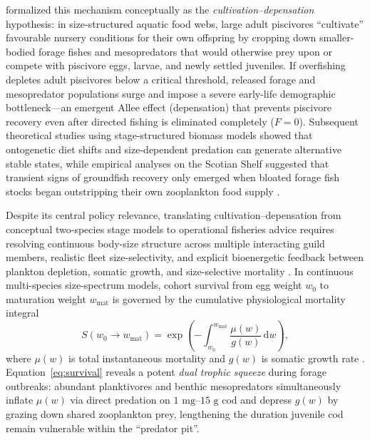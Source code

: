 \documentclass[11pt,letterpaper]{article}
\begin{document}
\citet{walters2001cultivation} formalized this mechanism conceptually as the \emph{cultivation--depensation} hypothesis: in size-structured aquatic food webs, large adult piscivores ``cultivate'' favourable nursery conditions for their own offspring by cropping down smaller-bodied forage fishes and mesopredators that would otherwise prey upon or compete with piscivore eggs, larvae, and newly settled juveniles. If overfishing depletes adult piscivores below a critical threshold, released forage and mesopredator populations surge and impose a severe early-life demographic bottleneck---an emergent Allee effect (depensation) that prevents piscivore recovery even after directed fishing is eliminated completely ($F = 0$). Subsequent theoretical studies using stage-structured biomass models \citep{vanleeuwen2008how,gardmark2015regime} showed that ontogenetic diet shifts and size-dependent predation can generate alternative stable states, while empirical analyses on the Scotian Shelf suggested that transient signs of groundfish recovery only emerged when bloated forage fish stocks began outstripping their own zooplankton food supply \citep{frank2011transient}.

Despite its central policy relevance, translating cultivation--depensation from conceptual two-species stage models to operational fisheries advice requires resolving continuous body-size structure across multiple interacting guild members, realistic fleet size-selectivity, and explicit bioenergetic feedback between plankton depletion, somatic growth, and size-selective mortality \citep{andersen2010damped,scott2014mizer,andersen2019fish}. In continuous multi-species size-spectrum models, cohort survival from egg weight $w_0$ to maturation weight $w_{\mathrm{mat}}$ is governed by the cumulative physiological mortality integral
\begin{equation}
  S(w_0 \to w_{\mathrm{mat}}) = \exp\!\left(-\int_{w_0}^{w_{\mathrm{mat}}} \frac{\mu(w)}{g(w)}\,\mathrm{d}w\right),
  \label{eq:survival}
\end{equation}
where $\mu(w)$ is total instantaneous mortality and $g(w)$ is somatic growth rate \citep{andersen2019fish}. Equation~\eqref{eq:survival} reveals a potent \emph{dual trophic squeeze} during forage outbreaks: abundant planktivores and benthic mesopredators simultaneously inflate $\mu(w)$ via direct predation on $1\text{ mg}$--$15\text{ g}$ cod and depress $g(w)$ by grazing down shared zooplankton prey, lengthening the duration juvenile cod remain vulnerable within the ``predator pit''.
\end{document}
